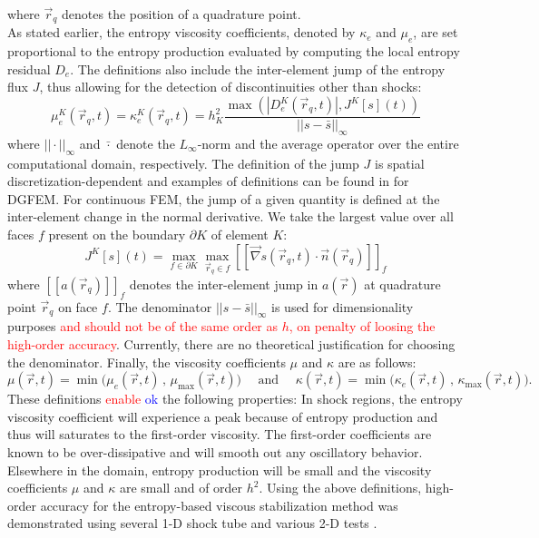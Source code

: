 \documentclass[preprint,10pt]{elsarticle}
\newcommand{\grad}{\vec{\nabla}}
\newcommand{\jmp}[1]{[\![#1]\!]}                     %
\newcommand{\tcr}[1]{\textcolor{red}{#1}}
\newcommand{\tcb}[1]{\textcolor{blue}{#1}}
\begin{document}
%
where $\vec{r}_q$ denotes the position of a quadrature point.\\
As stated earlier, the entropy viscosity coefficients, denoted by $\kappa_e$ and $\mu_e$, are set proportional to the entropy production evaluated by computing the local entropy residual $D_e$. The definitions also include the inter-element jump of the entropy flux $J$, thus allowing for the detection of discontinuities other than shocks:
%
\begin{equation}
\label{eq:ent_visc_coeff}
\mu^K_e(\vec{r}_q,t) = \kappa^K_e(\vec{r}_q,t) = h_K^2 \frac{\max\left( | D^K_e(\vec{r}_q,t) |, J^K[s](t) \right)}{|| s - \bar{s} ||_\infty} 
\end{equation}
%
where $|| \cdot ||_\infty$ and $\bar{\cdot}$ denote the $L_\infty$-norm and the average operator over the entire computational domain, respectively. The definition of the jump $J$ is spatial discretization-dependent and examples of definitions can be found in \cite{valentin} for DGFEM. For continuous FEM, the jump of a given quantity is defined at the inter-element change in the normal derivative. We take the largest value over all faces $f$ present on the boundary $\partial K$ of element $K$:
%
\begin{equation}
\label{eq:jump_CFEM}
J^K[s](t) = \max_{f\in\partial K}  \max_{\vec{r}_q \in f} \jmp{\grad s(\vec{r}_q,t) \cdot \vec{n}(\vec{r}_q) }_f
\end{equation}
%
where $\jmp{a(\vec{r}_q)}_f$ denotes the inter-element jump in $a(\vec{r})$ at quadrature point $\vec{r}_q$ on face $f$.  
The denominator $|| s - \bar{s} ||_\infty$ is used for dimensionality purposes \tcr{and should not be of the same order as $h$, on penalty of loosing the high-order accuracy}. Currently, there are no theoretical justification for choosing the denominator. 
Finally, the viscosity coefficients $\mu$ and $\kappa$ are as follows:
%
\begin{equation}
\mu(\vec{r},t)    = \min\Big( \mu_e(\vec{r},t)   \,,\, \mu_{\max}(\vec{r},t)    \Big) 
\quad \text{ and } \quad 
\kappa(\vec{r},t) = \min\Big( \kappa_e(\vec{r},t)\,,\, \kappa_{\max}(\vec{r},t) \Big).
\end{equation}
%
These definitions \tcr{enable} \tcb{ok} the following properties: 
In shock regions, the entropy viscosity coefficient will experience a peak because of entropy production and thus will saturates to the first-order viscosity. The first-order coefficients are known to be over-dissipative and will smooth out any oscillatory behavior. Elsewhere in the domain, entropy production will be small and the viscosity coefficients $\mu$ and $\kappa$ are small and of order $h^2$.
Using the above definitions, high-order accuracy for the entropy-based viscous stabilization method was demonstrated using several 1-D shock tube and various 2-D tests \cite{jlg1, jlg2, valentin}.
\end{document}
